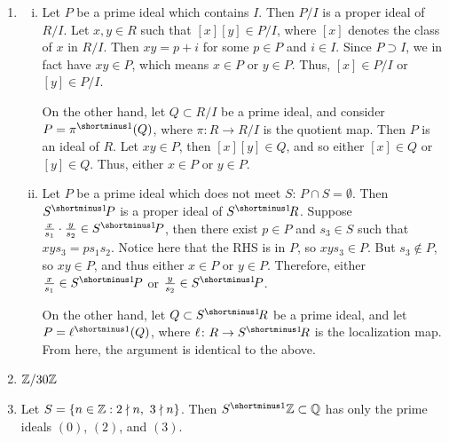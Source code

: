 \begin{solution}
\begin{enumerate}
    \item
    \begin{enumerate}[(i)]
        \item Let $P$ be a prime ideal which contains $I$. Then $P/I$ is a proper ideal of $R/I$. Let $x,y \in R$ such that $[x][y] \in P/I$, where $[x]$ denotes the class of $x$ in $R/I$. Then $xy = p + i$ for some $p \in P$ and $i \in I$. Since $P \supset I$, we in fact have $xy \in P$, which means $x \in P$ or $y \in P$. Thus, $[x] \in P/I$ or $[y] \in P/I$.
        
        On the other hand, let $Q \subset R/I$ be a prime ideal, and consider $P = \pi\inv(Q)$, where $\pi\colon R \to R/I$ is the quotient map. Then $P$ is an ideal of $R$. Let $xy \in P$, then $[x][y] \in Q$, and so either $[x] \in Q$ or $[y] \in Q$. Thus, either $x \in P$ or $y \in P$.
        
        \item Let $P$ be a prime ideal which does not meet $S$: $P \cap S = \emptyset$. Then $S\linv P$ is a proper ideal of $S\linv R$. Suppose $\frac{x}{s_1} \cdot \frac{y}{s_2} \in S\linv P$, then there exist $p \in P$ and $s_3 \in S$ such that $xys_3 = ps_1s_2$. Notice here that the RHS is in $P$, so $xys_3 \in P$. But $s_3 \notin P$, so $xy \in P$, and thus either $x \in P$ or $y \in P$. Therefore, either $\frac{x}{s_1} \in S\linv P$ or $\frac{y}{s_2} \in S\linv P$.
        
        On the other hand, let $Q \subset S\linv R$ be a prime ideal, and let $P = \ell\inv(Q)$, where $\ell\colon R \to S\linv R$ is the localization map. From here, the argument is identical to the above. 
    \end{enumerate}
    \item $\mathbb{Z}/30\mathbb{Z}$
    \item Let $S = \{n \in \mathbb{Z}: 2 \nmid n,\ 3 \nmid n\}$. Then $S\inv\Z \subset \Q$ has only the prime ideals $(0)$, $(2)$, and $(3)$.
\end{enumerate}
\end{solution}

